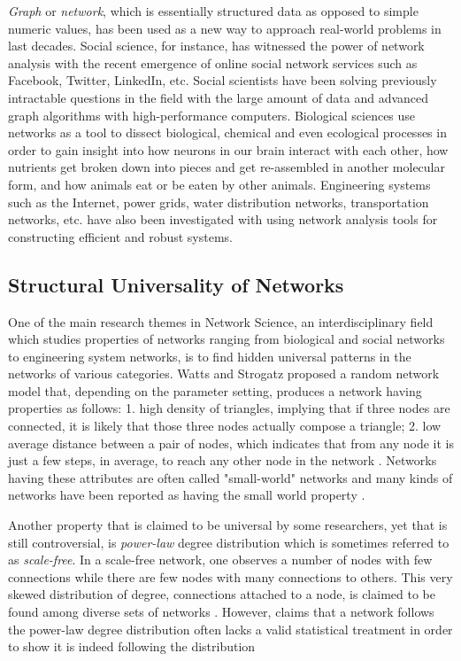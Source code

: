 \documentclass{article}
\begin{document}
	\textit{Graph} or \textit{network}, which is essentially structured data as opposed to simple numeric values, has been used as a new way to approach real-world problems in last decades. Social science, for instance, has witnessed the power of network analysis with the recent emergence of online social network services such as Facebook, Twitter, LinkedIn, etc.  Social scientists have been solving previously intractable questions in the field with the large amount of  data and advanced graph algorithms with high-performance computers. Biological sciences use networks as a tool to dissect biological, chemical and even ecological processes in order to gain insight into how neurons in our brain interact with each other, how nutrients get broken down into pieces and get re-assembled in another molecular form, and how animals eat or be eaten by other animals. Engineering systems such as the Internet, power grids, water distribution networks, transportation networks, etc. have also been investigated with using network analysis tools for constructing efficient and robust systems. 
	
	
	\subsection{Structural Universality of Networks}
	
	One of the main research themes in Network Science, an interdisciplinary field which studies properties of networks ranging from biological and social networks to engineering system networks, is to find hidden universal patterns in the networks of various categories. 
	Watts and Strogatz proposed a random network model that, depending on the parameter setting, produces a network having properties as follows: 1. high density of triangles, implying that if three nodes are connected, it is likely that those three nodes actually compose a triangle; 2. low average distance between a pair of nodes, which indicates that from any node it is just a few steps, in average, to reach any other node in the network \cite{watts1998cds}. Networks having these attributes are often called "small-world" networks and many kinds of networks have been reported as having the small world property \cite{Network_Small-World-Ness}.

	
	
	 Another property that is claimed to be universal by some researchers, yet that is still controversial, is \textit{power-law} degree distribution which is sometimes referred to as \textit{scale-free}. In a scale-free network, one observes a number of nodes with few connections while there are few nodes with many connections to others. This very skewed distribution of degree, connections attached to a node, is claimed to be found among diverse sets of networks \cite{Barabasi99emergenceScaling}. However, claims that a network follows the power-law degree distribution often lacks a valid statistical treatment in order to show it is indeed following the distribution \cite{Clauset:PowerLaw}
\end{document}
